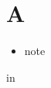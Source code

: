\documentclass[11pt]{article}
\author{root}
\date{\today}
\title{}
\begin{document}
\tableofcontents

\section{A}
\label{sec:org82ac558}
\begin{itemize}
\item note
\end{itemize}
in
\end{document}
